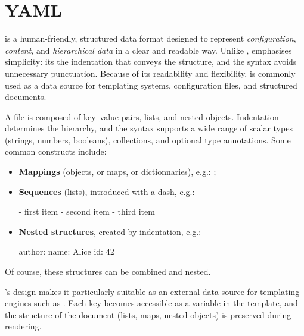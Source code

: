 \section{YAML}
\label{app:yaml}

\YAML{} is a human-friendly, structured data format designed to represent
\emph{configuration}, \emph{content}, and \emph{hierarchical data} in a
clear and readable way. %
Unlike \JSON{}, \YAML{} emphasises simplicity: its the indentation that
conveys the structure, and the syntax avoids unnecessary punctuation. %
Because of its readability and flexibility, \YAML{} is commonly used as a
data source for templating systems, configuration files, and structured
documents. %

\medskip

A \YAML{} file is composed of key--value pairs, lists, and nested
objects. %
Indentation determines the hierarchy, and the syntax supports a wide range
of scalar types (strings, numbers, booleans), collections, and optional
type annotations. %
Some common constructs include: %

\begin{itemize}
  \item \textbf{Mappings} (objects, or maps, or dictionnaries), e.g.:
         ;
  \item \textbf{Sequences} (lists), introduced with a dash, e.g.:
    \begin{ymlblock}
      - first item
      - second item
      - third item
    \end{ymlblock}
  \item \textbf{Nested structures}, created by indentation, e.g.:
    \begin{ymlblock}
      author:
          name: Alice
          id: 42
    \end{ymlblock}
\end{itemize}

\medskip

Of course, these structures can be combined and nested. %

\YAML’s design makes it particularly suitable as an external data source
for templating engines such as . %
Each \YAML{} key becomes accessible as a variable in the template, and the
structure of the \YAML{} document (lists, maps, nested objects) is
preserved during rendering. %


